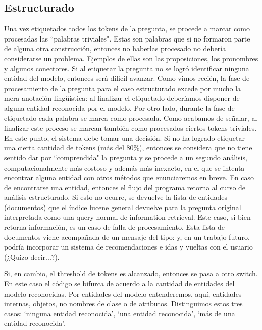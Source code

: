 \subsection{Estructurado}

Una vez etiquetados todos los tokens de la pregunta, se procede a marcar como procesadas las ``palabras triviales". Estas son palabras que si no formaron parte de alguna otra construcción, entonces no haberlas procesado no debería considerarse un problema. Ejemplos de ellas son las proposiciones, los pronombres y algunos conectores. Si al etiquetar la pregunta no se logró identificar ninguna entidad del modelo, entonces será dificil avanzar. Como vimos recién, la fase de procesamiento de la pregunta para el caso estructurado excede por mucho la mera anotación lingüística: al finalizar el etiquetado deberíamos disponer de alguna entidad reconocida por el modelo. Por otro lado, durante la fase de etiquetado cada palabra se marca como procesada. Como acabamos de señalar, al finalizar este proceso se marcan también como procesados ciertos tokens triviales. En este punto, el sistema debe tomar una decisión. Si no ha logrado etiquetar una cierta cantidad de tokens (más del 80\%), entonces se considera que no tiene sentido dar por ``comprendida" la pregunta y se procede a un segundo análisis, computacionalmente más costoso y además más inexacto, en el que se intenta encontrar alguna entidad con otros métodos que enunciaremos en breve. En caso de encontrarse una entidad, entonces el flujo del programa retorna al curso de análisis estructurado. Si esto no ocurre, se devuelve la lista de entidades (documentos) que el índice lucene general devuelve para la pregunta original interpretada como una query normal de information retrieval. Este caso, si bien retorna información, es un caso de falla de procesamiento. Esta lista de documentos viene acompañada de un mensaje del tipo:  y, en un trabajo futuro, podría incorporar un sistema de recomendaciones e idas y vueltas con el usuario (¿Quizo decir...?).

Si, en cambio, el threshold de tokens es alcanzado, entonces se pasa a otro switch. En este caso el código se bifurca de acuerdo a la cantidad de entidades del modelo reconocidas. Por entidades del modelo entenderemos, aquí, entidades internas, objetos, no nombres de clase o de atributos. Distinguimos estos tres casos: `ninguna entidad reconocida', `una entidad reconocida', `más de una entidad reconocida'.


